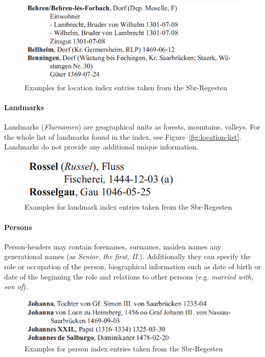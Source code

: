 \begin{figure}[h]
  \centering
  \includegraphics[scale=0.45]{img/location-example}
  \caption{Examples for location index entries taken from the Sbr-Regesten}
  \label{fig:location-example}
\end{figure}

\paragraph{Landmarks}
Landmarks (\textit{Flurnamen}) are geographical units as forests, mountains, valleys. For the whole list of landmarks found in the index, see Figure~\ref{fig:location-list}. Landmarks do not provide any additional unique information.%

\begin{figure}[h]
  \centering
  \includegraphics[scale=0.45]{img/landmark-example}
  \caption{Examples for landmark index entries taken from the Sbr-Regesten}
  \label{fig:landmark-example}
\end{figure}

\paragraph{Persons}
Person-headers may contain forenames, surnames, maiden names any generational names (as \textit{Senior, the first, II.}). Additionally they can specify the role or occupation of the person, biographical information such as date of birth or date of the beginning the role and relations to other persons (e.g. \textit{married with, son of}).%
\begin{figure}[h]
  \centering
  \includegraphics[scale=0.45]{img/person-example}
  \caption{Examples for person index entries taken from the Sbr-Regesten}
  \label{fig:person-example}
\end{figure}

